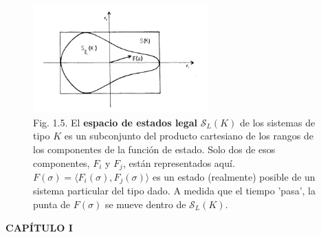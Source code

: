 {\begin{figure}[h!]
    \centering
    \includegraphics[width=0.6\textwidth]{imagenes/figura1.5.png}
    \caption*{Fig. 1.5. El \textbf{espacio de estados legal} $\mathcal{S}_L(K)$ de los sistemas de tipo $K$ es un subconjunto del producto cartesiano de los rangos de los componentes de la función de estado. Solo dos de esos componentes, $F_i$ y $F_j$, están representados aquí. $F(\sigma) = \langle F_i(\sigma), F_j(\sigma) \rangle$ es un estado (realmente) posible de un sistema particular del tipo dado. A medida que el tiempo 'pasa', la punta de $F(\sigma)$ se mueve dentro de $\mathcal{S}_L(K)$.}
\end{figure}
}

\newpage
\fancyhf{}
\fancyhead[l]{\thepage}
\begin{center}
{\fontsize{13}{16}\selectfont \textbf{CAPÍTULO I}}
\end{center}
\vspace{0.5cm}

